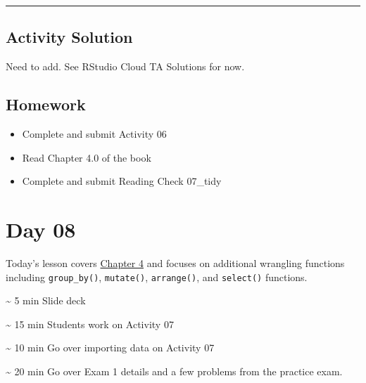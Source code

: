 \documentclass[
  letterpaper,
  DIV=11,
  numbers=noendperiod]{scrreprt}
\begin{document}
\begin{center}\rule{0.5\linewidth}{0.5pt}\end{center}

\hypertarget{activity-solution-5}{%
\section*{Activity Solution}\label{activity-solution-5}}

Need to add. See RStudio Cloud TA Solutions for now.

\hypertarget{homework-6}{%
\section*{Homework}\label{homework-6}}

\begin{itemize}
\item
  Complete and submit Activity 06
\item
  Read Chapter 4.0 of the book
\item
  Complete and submit Reading Check 07\_tidy
\end{itemize}


\hypertarget{day-08}{%
\chapter*{Day 08}\label{day-08}}

Today's lesson covers
\href{https://nustat.github.io/intro-stat-data-sci/04-tidy.html}{Chapter
4} and focuses on additional wrangling functions including
\texttt{group\_by()}, \texttt{mutate()}, \texttt{arrange()}, and
\texttt{select()} functions.

\begin{tcolorbox}[enhanced jigsaw, colframe=quarto-callout-note-color-frame, breakable, colback=white, toprule=.15mm, leftrule=.75mm, title={Agenda}, left=2mm, coltitle=black, bottomtitle=1mm, bottomrule=.15mm, rightrule=.15mm, colbacktitle=quarto-callout-note-color!10!white, opacitybacktitle=0.6, opacityback=0, toptitle=1mm, arc=.35mm, titlerule=0mm]
\textasciitilde{} 5 min Slide deck

\textasciitilde{} 15 min Students work on Activity 07

\textasciitilde{} 10 min Go over importing data on Activity 07

\textasciitilde{} 20 min Go over Exam 1 details and a few problems from
the practice exam.
\end{tcolorbox}
\end{document}
